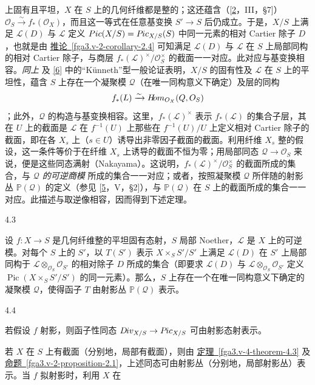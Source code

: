 \begin{enumerate}
上固有且平坦，\(X\) 在 \(S\) 上的几何纤维都是整的；这还蕴含（[\hyperref[GD1960]{2}，III，§7]）\(\mathcal {O}_S\xrightarrow {\sim } f_*(\mathcal {O}_X)\)，而且这一等式在任意基变换 \(S'\to  S\) 后仍成立。于是，\(X/S\) 上满足 \(\mathscr {L}(D)\) 与 \(\mathscr {L}\) 定义 \(\operatorname {Pic}(X/S)=\mathscr {P}\kern  -1pt\mathit {ic}_{X/S}(S)\) 中同一元素的相对 Cartier 除子 \(D\)，也就是由 \hyperref[fga3.v-2-corollary-2.4]{推论~\ref*{fga3.v-2-corollary-2.4}} 可知满足 \(\mathscr {L}(D)\) 与 \(\mathscr {L}\) 在 \(S\) 上局部同构的相对 Cartier 除子，与商层 \(f_*(\mathscr {L})^{\times }/\mathscr {O}_S^\times \) 的截面一一对应。此对应与基变换相容。\emph{同上} 及 \hyperref[fga3.v-bib-6]{[6]} 中的“Künneth”型一般论证表明，\(X/S\) 的固有性及 \(\mathscr {L}\) 在 \(S\) 上的平坦性，蕴含 \(S\) 上存在一个凝聚模 \(\mathscr {Q}\)（在唯一同构意义下确定）及层的同构 \[     f_*(\mathscr {L})     \xrightarrow {\sim } \mathscr {H}\kern  -2.5pt\mathit {om}_{\mathcal {O}_X}(\mathscr {Q},\mathcal {O}_S)   \]；此外，\(\mathscr {Q}\) 的构造与基变换相容。这里，\(f_*(\mathscr {L})^\times \) 表示 \(f_*(\mathscr {L})\) 的集合子层，其在 \(U\) 上的截面是 \(\mathscr {L}\) 在 \(f^{-1}(U)\) 上那些在 \(f^{-1}(U)/U\) 上定义相对 Cartier 除子的截面，即在各 \(X_s\) 上（\(s\in  U\)）诱导出非零因子截面的截面。利用纤维 \(X_s\) 整的假设，这一条件等价于在纤维 \(X_s\) 上诱导的截面不恒为零；用局部同态 \(\mathscr {Q}\to \mathcal {O}_S\) 来说，便是这些同态满射（Nakayama）。这说明，\(f_*(\mathscr {L})^{\times }/\mathcal {O}_S^\times \) 的截面所成的集合，与 \emph{\(\mathscr {Q}\) 的可逆商模} 所成的集合一一对应；或者，按照凝聚模 \(\mathscr {Q}\) 所伴随的射影丛 \(\mathbb {P}(\mathscr {Q})\) 的定义（参见 [\hyperref[Gro1960a]{5}，V，§2]），与 \(\mathbb {P}(\mathscr {Q})\) 在 \(S\) 上的截面所成的集合一一对应。此描述与取逆像相容，因而得到下述定理。\begin{theorem}{4.3}\label{fga3.v-4-theorem-4.3}\skipsinglepar\par{}设 \(f\colon  X\to  S\) 是几何纤维整的平坦固有态射，\(S\) 局部 Noether，\(\mathscr {L}\) 是 \(X\) 上的可逆模。对每个 \(S\) 上的 \(S'\)，以 \(T(S')\) 表示 \(X\times _S S'/S'\) 上满足 \(\mathscr {L}(D)\) 在 \(S'\) 上局部同构于 \(\mathscr {L}\otimes _{\mathcal {O}_S}\mathcal {O}_{S'}\) 的相对除子 \(D\) 所成的集合（即要求 \(\mathscr {L}(D)\) 与 \(\mathscr {L}\otimes _{\mathcal {O}_S}\mathcal {O}_{S'}\) 定义 \(\operatorname {Pic}(X\times _S S'/S')\) 的同一元素）。那么，\(S\) 上存在一个在唯一同构意义下确定的凝聚模 \(\mathscr {Q}\)，使得函子 \(T\) 由射影丛 \(\mathbb {P}(\mathscr {Q})\) 表示。\end{theorem}\begin{corollary}{4.4}\label{fga3.v-4-corollary-4.4}\skipsinglepar\par{}若假设 \(f\) 射影，则函子性同态 \(\mathscr {D}\kern  -1pt\mathit {iv}_{X/S}\to \mathscr {P}\kern  -1pt\mathit {ic}_{X/S}\) 可由射影态射表示。\end{corollary}\par{}若 \(X\) 在 \(S\) 上有截面（分别地，局部有截面），则由 \hyperref[fga3.v-4-theorem-4.3]{定理~\ref*{fga3.v-4-theorem-4.3}} 及 \hyperref[fga3.v-2-proposition-2.1]{命题~\ref*{fga3.v-2-proposition-2.1}}，上述同态可由射影丛（分别地，局部射影丛）表示。当 \(f\) 拟射影时，利用 \(X\) 在 
\end{enumerate}
